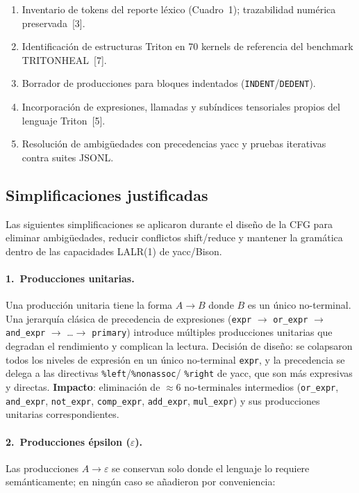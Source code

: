 \begin{enumerate}
  \item Inventario de tokens del reporte léxico (Cuadro~1); trazabilidad numérica preservada~[3].
  \item Identificación de estructuras Triton en 70 kernels de referencia del benchmark TRITONHEAL~[7].
  \item Borrador de producciones para bloques indentados (\texttt{INDENT}/\texttt{DEDENT}).
  \item Incorporación de expresiones, llamadas y subíndices tensoriales propios del lenguaje Triton~[5].
  \item Resolución de ambigüedades con precedencias yacc y pruebas iterativas contra suites JSONL.
\end{enumerate}

\subsection{Simplificaciones justificadas}
\label{sec:simplificaciones}

Las siguientes simplificaciones se aplicaron durante el diseño de la CFG para
eliminar ambigüedades, reducir conflictos shift/reduce y mantener la gramática
dentro de las capacidades LALR(1) de yacc/Bison.

\paragraph{1.\ Producciones unitarias.}
Una producción unitaria tiene la forma $A \rightarrow B$ donde $B$ es un único
no-terminal. Una jerarquía clásica de precedencia de expresiones (\texttt{expr}
$\rightarrow$ \texttt{or\_expr} $\rightarrow$ \texttt{and\_expr} $\rightarrow$
\ldots $\rightarrow$ \texttt{primary}) introduce múltiples producciones unitarias
que degradan el rendimiento y complican la lectura. Decisión de diseño: se
colapsaron todos los niveles de expresión en un único no-terminal \texttt{expr},
y la precedencia se delega a las directivas \texttt{\%left}/\texttt{\%nonassoc}/%
\texttt{\%right} de yacc, que son más expresivas y directas.
\textbf{Impacto}: eliminación de $\approx$6 no-terminales intermedios
(\texttt{or\_expr}, \texttt{and\_expr}, \texttt{not\_expr}, \texttt{comp\_expr},
\texttt{add\_expr}, \texttt{mul\_expr}) y sus producciones unitarias
correspondientes.

\paragraph{2.\ Producciones épsilon ($\varepsilon$).}
Las producciones $A \rightarrow \varepsilon$ se conservan solo donde el lenguaje
lo requiere semánticamente; en ningún caso se añadieron por conveniencia:

